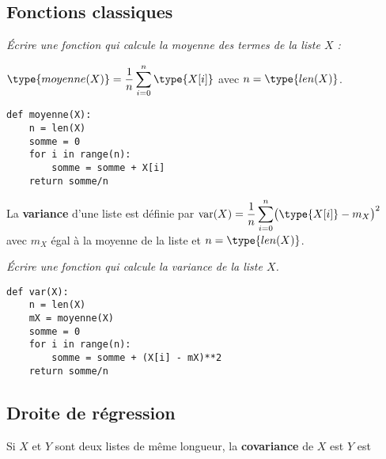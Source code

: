 \subsection{Fonctions classiques} 
\begin{Exercise}[title = Moyenne]
\it Écrire une fonction  qui calcule la moyenne des termes de la liste $X$ :

$\displaystyle \type{moyenne(X)} = \frac 1n \sum_{i=0}^n \type{X[i]}$ avec $n = \type{len(X)}$.
\end{Exercise}
\begin{Answer}
\begin{lstlisting}
def moyenne(X):
    n = len(X)
    somme = 0
    for i in range(n):
        somme = somme + X[i]
    return somme/n
\end{lstlisting}
\end{Answer}
\bigskip

La {\bf variance} d'une liste est définie par $\displaystyle \text{var}(X) =  \frac 1n \sum_{i=0}^n \bigl(\type{X[i]} -m_X\bigr)^2$ avec $m_X$ égal à la moyenne de la liste et $n = \type{len(X)}$.
\begin{Exercise}[title = Variance]
\it Écrire une fonction  qui calcule la variance de la liste $X$.
\end{Exercise}
\begin{Answer}
\begin{lstlisting}
def var(X):
    n = len(X)
    mX = moyenne(X)
    somme = 0
    for i in range(n):
        somme = somme + (X[i] - mX)**2
    return somme/n
\end{lstlisting}
\end{Answer}
\subsection{Droite de régression} 
Si $X$ et $Y$ sont deux listes de même longueur, la {\bf covariance} de $X$ est $Y$ est 

